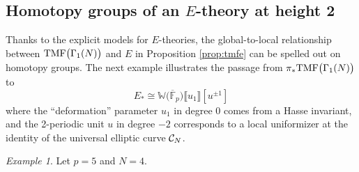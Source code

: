 \documentclass{gtpart}
\theoremstyle{definition}
\theoremstyle{remark}
\newtheorem{ex}[thm]{Example}
\newcommand{\mb}[1]{\mathbb{#1}}
\newcommand{\cF}{\overline {\mb F}}
\newcommand{\CC}{{\cal C}}
\newcommand{\BW}{{\mb W}}
\newcommand{\TMF}{{\rm TMF}}
\newcommand{\G}{\Gamma}
\newcommand{\lb}{\llbracket}
\newcommand{\rb}{\rrbracket}
\renewcommand{\=}{\approx}
\renewcommand{\-}{\sim}
\numberwithin{equation}{section}
\numberwithin{thm}{section}
\begin{document}
\subsection{Homotopy groups of an $E$-theory at height 2}
\label{subsec:mfe0}

Thanks to the explicit models for $E$-theories, 
the global-to-local relationship between $\TMF\big(\G_1(N)\big)$ and $E$ in Proposition \ref{prop:tmfe} can be spelled out on homotopy groups.  
The next example illustrates the passage from $\pi_* \TMF\big(\G_1(N)\big)$ to 
\[
 E_* \cong \BW \big( \cF_p \big) \lb u_1 \rb [u^{\pm 1}] 
\]
where the ``deformation'' parameter $u_1$ in degree 0 comes from a Hasse invariant, 
and the 2-periodic unit $u$ in degree $-2$ corresponds to a local uniformizer at the identity of the universal elliptic curve $\CC_N$.  
\begin{ex}
 \label{ex:mfe0}
 Let $p = 5$ and $N = 4$.  


\end{ex}
\end{document}
